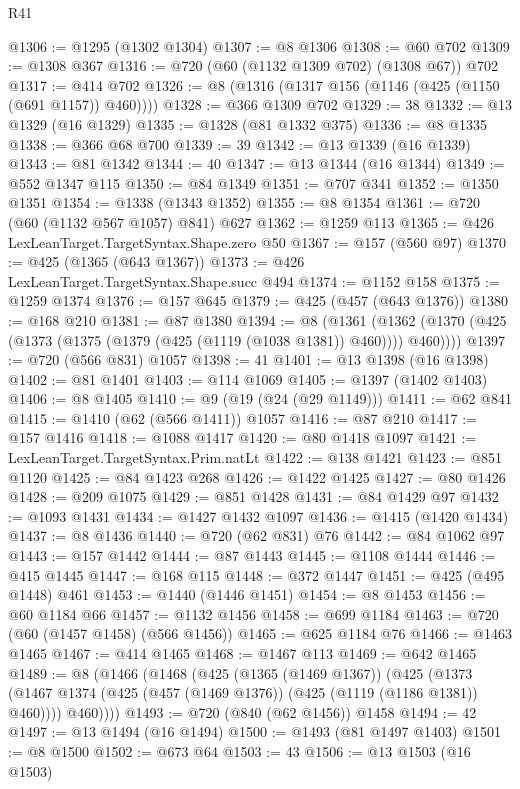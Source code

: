 \begin{lexlean}{R41}
\begin{coremodule}
@1306 := @1295 (@1302 @1304)
@1307 := @8 @1306
@1308 := @60 @702
@1309 := @1308 @367
@1316 := @720 (@60 (@1132 @1309 @702) (@1308 @67)) @702
@1317 := @414 @702
@1326 := @8 (@1316 (@1317 @156 (@1146 (@425 (@1150 (@691 @1157)) @460))))
@1328 := @366 @1309 @702
@1329 := 38
@1332 := @13 @1329 (@16 @1329)
@1335 := @1328 (@81 @1332 @375)
@1336 := @8 @1335
@1338 := @366 @68 @700
@1339 := 39
@1342 := @13 @1339 (@16 @1339)
@1343 := @81 @1342
@1344 := 40
@1347 := @13 @1344 (@16 @1344)
@1349 := @552 @1347 @115
@1350 := @84 @1349
@1351 := @707 @341
@1352 := @1350 @1351
@1354 := @1338 (@1343 @1352)
@1355 := @8 @1354
@1361 := @720 (@60 (@1132 @567 @1057) @841) @627
@1362 := @1259 @113
@1365 := @426 LexLeanTarget.TargetSyntax.Shape.zero @50
@1367 := @157 (@560 @97)
@1370 := @425 (@1365 (@643 @1367))
@1373 := @426 LexLeanTarget.TargetSyntax.Shape.succ @494
@1374 := @1152 @158
@1375 := @1259 @1374
@1376 := @157 @645
@1379 := @425 (@457 (@643 @1376))
@1380 := @168 @210
@1381 := @87 @1380
@1394 := @8
    (@1361 (@1362 (@1370 (@425 (@1373 (@1375 (@1379 (@425 (@1119 (@1038 @1381)) @460)))) @460))))
@1397 := @720 (@566 @831) @1057
@1398 := 41
@1401 := @13 @1398 (@16 @1398)
@1402 := @81 @1401
@1403 := @114 @1069
@1405 := @1397 (@1402 @1403)
@1406 := @8 @1405
@1410 := @9 (@19 (@24 (@29 @1149)))
@1411 := @62 @841
@1415 := @1410 (@62 (@566 @1411)) @1057
@1416 := @87 @210
@1417 := @157 @1416
@1418 := @1088 @1417
@1420 := @80 @1418 @1097
@1421 := LexLeanTarget.TargetSyntax.Prim.natLt
@1422 := @138 @1421
@1423 := @851 @1120
@1425 := @84 @1423 @268
@1426 := @1422 @1425
@1427 := @80 @1426
@1428 := @209 @1075
@1429 := @851 @1428
@1431 := @84 @1429 @97
@1432 := @1093 @1431
@1434 := @1427 @1432 @1097
@1436 := @1415 (@1420 @1434)
@1437 := @8 @1436
@1440 := @720 (@62 @831) @76
@1442 := @84 @1062 @97
@1443 := @157 @1442
@1444 := @87 @1443
@1445 := @1108 @1444
@1446 := @415 @1445
@1447 := @168 @115
@1448 := @372 @1447
@1451 := @425 (@495 @1448) @461
@1453 := @1440 (@1446 @1451)
@1454 := @8 @1453
@1456 := @60 @1184 @66
@1457 := @1132 @1456
@1458 := @699 @1184
@1463 := @720 (@60 (@1457 @1458) (@566 @1456))
@1465 := @625 @1184 @76
@1466 := @1463 @1465
@1467 := @414 @1465
@1468 := @1467 @113
@1469 := @642 @1465
@1489 := @8
    (@1466
      (@1468
        (@425
          (@1365 (@1469 @1367))
          (@425
            (@1373 (@1467 @1374 (@425 (@457 (@1469 @1376)) (@425 (@1119 (@1186 @1381)) @460))))
            @460))))
@1493 := @720 (@840 (@62 @1456)) @1458
@1494 := 42
@1497 := @13 @1494 (@16 @1494)
@1500 := @1493 (@81 @1497 @1403)
@1501 := @8 @1500
@1502 := @673 @64
@1503 := 43
@1506 := @13 @1503 (@16 @1503)

\end{coremodule}
\end{lexlean}
